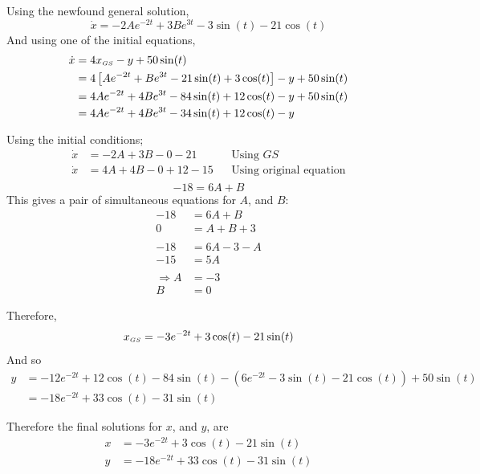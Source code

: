 \documentclass[11pt, a4paper]{article}
\begin{document}
Using the newfound general solution,
\begin{equation*}
\dot{x}=-2Ae^{-2t}+3Be^{3t}-3\sin(t)-21\cos(t)
\end{equation*}
And using one of the initial equations,
\begin{align*}
\dot{x}&=4x_{\text{\tiny{$GS$}}}-y+50\sin(t) \\
&=4\left[ Ae^{-2t}+Be^{3t}-21\sin(t)+3\cos(t) \right] -y+50\sin(t) \\
&=4Ae^{-2t}+4Be^{3t}-84\sin(t)+12\cos(t)-y+50\sin(t) \\
&=4Ae^{-2t}+4Be^{3t}-34\sin(t)+12\cos(t)-y
\end{align*}

Using the initial conditions;
\begin{align*}
\dot{x}&=-2A+3B-0-21 & &\text{Using $GS$} \\
\dot{x}&=4A+4B-0+12-15 & &\text{Using original equation} \\
\end{align*}
\vspace{-1.2cm}
\begin{equation*}
-18=6A+B
\end{equation*} \newline
This gives a pair of simultaneous equations for $A$, and $B$:
\begin{align*}
-18&=6A+B \\
0&=A+B+3 \\
& \\
-18&=6A-3-A \\
-15&=5A \\
& \\
\Rightarrow A&=-3 \\
B&=0
\end{align*}

Therefore,
\begin{equation*}
x_{\text{\tiny{$GS$}}}=-3e^{-2t}+3\cos(t)-21\sin(t)
\end{equation*}
And so
\small
\begin{align*}
y&=-12e^{-2t}+12\cos(t)-84\sin(t)-\left(6e^{-2t}-3\sin(t)-21\cos(t)\right)+50\sin(t) \\
&=-18e^{-2t}+33\cos(t)-31\sin(t)
\end{align*}
\normalsize

Therefore the final solutions for $x$, and $y$, are
\begin{align*}
x&=-3e^{-2t}+3\cos(t)-21\sin(t) \\
y&=-18e^{-2t}+33\cos(t)-31\sin(t)
\end{align*}
\vspace{0.5cm}
\end{document}
